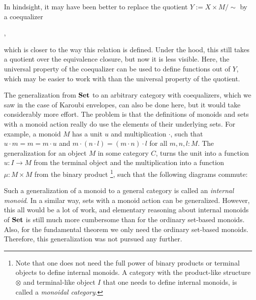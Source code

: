 In hindsight, it may have been better to replace the quotient $ Y := X \times M / \sim $ by a coequalizer
\begin{center}
  ,
\end{center}
which is closer to the way this relation is defined. Under the hood, this still takes a quotient over the equivalence closure, but now it is less visible. Here, the universal property of the coequalizer can be used to define functions out of $ Y $, which may be easier to work with than the universal property of the quotient.

The generalization from $ \mathbf{Set} $ to an arbitrary category with coequalizers, which we saw in the case of Karoubi envelopes, can also be done here, but it would take considerably more effort. The problem is that the definitions of monoids and sets with a monoid action really do use the elements of their underlying sets. For example, a monoid $ M $ has a unit $ u $ and multiplication $ \cdot $, such that $ u \cdot m = m = m \cdot u $ and $ m \cdot (n \cdot l) = (m \cdot n) \cdot l $ for all $ m, n, l : M $. The generalization for an object $ M $ in some category $ C $, turns the unit into a function $ u : I \to M $ from the terminal object and the multiplication into a function $ \mu : M \times M $ from the binary product
\footnote{Note that one does not need the full power of binary products or terminal objects to define internal monoids. A category with the product-like structure $ \otimes $ and terminal-like object $ I $ that one needs to define internal monoids, is called a \textit{monoidal category}.},
such that the following diagrams commute:
\begin{center}
\end{center}
Such a generalization of a monoid to a general category is called an \textit{internal monoid}. In a similar way, sets with a monoid action can be generalized. However, this all would be a lot of work, and elementary reasoning about internal monoids of $ \mathbf{Set} $ is still much more cumbersome than for the ordinary set-based monoids. Also, for the fundamental theorem we only need the ordinary set-based monoids. Therefore, this generalization was not pursued any further.

